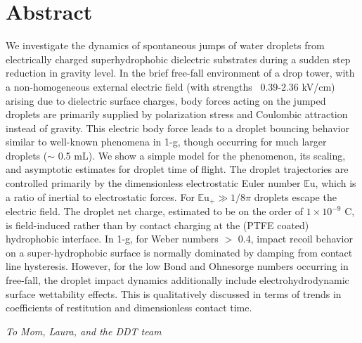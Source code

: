 \documentclass[12pt,a4paper,oneside]{book}
\begin{document}
\section*{Abstract}
\noindent
We investigate the dynamics of spontaneous jumps of water droplets from electrically charged superhydrophobic dielectric substrates during a sudden step reduction in gravity level. In the brief free-fall environment of a drop tower, with a non-homogeneous external electric field (with strengths ~0.39-2.36 kV/cm) arising due to dielectric surface charges, body forces acting on the jumped droplets are primarily supplied by polarization stress and Coulombic attraction instead of gravity. This electric body force leads to a droplet bouncing behavior similar to well-known phenomena in 1-g, though occurring for much larger droplets ($\sim$ 0.5 mL). We show a simple model for the phenomenon, its scaling, and asymptotic estimates for droplet time of flight. The droplet trajectories are controlled primarily by the dimensionless electrostatic Euler number $\mathbb{E}\mbox{u}$, which is a ratio of inertial to electrostatic forces. For ${\mathbb{E}\mbox{u}}_+ \gg 1/8 \pi$ droplets escape the electric field. The droplet net charge, estimated to be on the order of $1 \times 10^{-9}$ C, is field-induced rather than by contact charging at the (PTFE coated) hydrophobic interface. In 1-g, for Weber numbers $>$ 0.4, impact recoil behavior on a super-hydrophobic surface is normally dominated by damping from contact line hysteresis. However, for the low Bond and Ohnesorge numbers occurring in free-fall, the droplet impact dynamics additionally include electrohydrodynamic surface wettability effects. This is qualitatively discussed in terms of trends in coefficients of restitution and dimensionless contact time.

\clearpage

\vspace*{\fill}

\emph{To Mom, Laura, and the DDT team}\\
\vspace*{\fill}

\clearpage
\end{document}
